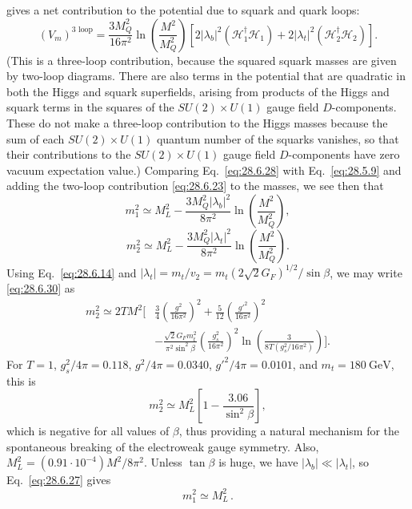 gives a net contribution to the potential due to squark and quark loops:
\begin{equation}
  (V_m)^{\text{3 loop}}
  =\frac{3M_Q^2}{16\pi^2}\ln\left(\frac{M^2}{M_Q^2}\right)
  \left[
    2\lvert\lambda_b\rvert^2(\mathcal{H}_1^\dagger\mathcal{H}_1)
    +2\lvert\lambda_t\rvert^2(\mathcal{H}_2^\dagger\mathcal{H}_2)
  \right].
  \tag{28.6.28}\label{eq:28.6.28}
\end{equation}
(This is a three-loop contribution, because the squared squark masses are
given by two-loop diagrams. There are also terms in the potential that are
quadratic in both the Higgs and squark superfields, arising from products
of the Higgs and squark terms in the squares of the
\(SU(2)\times U(1)\) gauge field \(D\)-components. These do not
make a three-loop contribution to the Higgs masses because the sum of each
\(SU(2)\times U(1)\) quantum number of the squarks vanishes, so
that their contributions to the \(SU(2)\times U(1)\) gauge field
\(D\)-components have zero vacuum expectation value.) Comparing
Eq.~\eqref{eq:28.6.28} with Eq.~\eqref{eq:28.5.9} and adding the two-loop
contribution \eqref{eq:28.6.23} to the masses, we see then that
\begin{equation}
  m_1^2\simeq M_L^2
  -\frac{3M_Q^2\lvert\lambda_b\rvert^2}{8\pi^2}
   \ln\left(\frac{M^2}{M_Q^2}\right),
  \tag{28.6.29}\label{eq:28.6.29}
\end{equation}
\begin{equation}
  m_2^2\simeq M_L^2
  -\frac{3M_Q^2\lvert\lambda_t\rvert^2}{8\pi^2}
   \ln\left(\frac{M^2}{M_Q^2}\right).
  \tag{28.6.30}\label{eq:28.6.30}
\end{equation}
Using Eq.~\eqref{eq:28.6.14} and
\(\lvert\lambda_t\rvert=m_t/v_2
=m_t(2\sqrt{2}G_F)^{1/2}/\sin\beta\), we may write
\eqref{eq:28.6.30} as
\begin{equation}
  \begin{aligned}
    m_2^2\simeq2TM^2\Bigg[
      &\frac{3}{4}\left(\frac{g^2}{16\pi^2}\right)^2
      +\frac{5}{12}\left(\frac{g'^2}{16\pi^2}\right)^2\\
      &-\frac{\sqrt{2}G_Fm_t^2}{\pi^2\sin^2\beta}
       \left(\frac{g_s^2}{16\pi^2}\right)^2
       \ln\left(\frac{3}{8T(g_s^2/16\pi^2)}\right)
    \Bigg].
  \end{aligned}
  \tag{28.6.31}\label{eq:28.6.31}
\end{equation}
For \(T=1\), \(g_s^2/4\pi=0.118\), \(g^2/4\pi=0.0340\),
\(g'^2/4\pi=0.0101\), and \(m_t=180\ \mathrm{GeV}\), this is
\begin{equation}
  m_2^2\simeq M_L^2
  \left[1-\frac{3.06}{\sin^2\beta}\right],
  \tag{28.6.32}\label{eq:28.6.32}
\end{equation}
which is negative for all values of \(\beta\), thus providing a natural
mechanism for the spontaneous breaking of the electroweak gauge symmetry.
Also, \(M_L^2=(0.91\mathbin{\cdot}10^{-4})M^2/8\pi^2\). Unless
\(\tan\beta\) is huge, we have
\(\lvert\lambda_b\rvert\ll\lvert\lambda_t\rvert\), so
Eq.~\eqref{eq:28.6.27} gives
\begin{equation}
  m_1^2\simeq M_L^2\,.
  \tag{28.6.33}\label{eq:28.6.33}
\end{equation}

